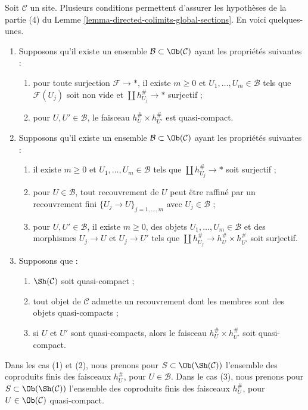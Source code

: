 \begin{remark}
\label{remark-stronger-conditions}
Soit $\mathcal{C}$ un site. Plusieurs conditions permettent d’assurer
les hypothèses de la partie (4) du
Lemme \ref{lemma-directed-colimits-global-sections}.
En voici quelques-unes.
\begin{enumerate}
\item Supposons qu’il existe un ensemble $\mathcal{B} \subset \Ob(\mathcal{C})$
ayant les propriétés suivantes :
\begin{enumerate}
\item pour toute surjection $\mathcal{F} \to *$, il existe
$m \geq 0$ et $U_1, \ldots, U_m \in \mathcal{B}$ tels que
$\mathcal{F}(U_j)$ soit non vide et $\coprod h_{U_j}^\# \to *$ surjectif ;
\item pour $U, U' \in \mathcal{B}$, le faisceau
$h_U^\# \times h_{U'}^\#$ est quasi-compact.
\end{enumerate}
\item Supposons qu’il existe un ensemble $\mathcal{B} \subset \Ob(\mathcal{C})$
ayant les propriétés suivantes :
\begin{enumerate}
\item il existe $m \geq 0$ et $U_1, \ldots, U_m \in \mathcal{B}$ tels que
$\coprod h_{U_j}^\# \to *$ soit surjectif ;
\item pour $U \in \mathcal{B}$, tout recouvrement de $U$ peut être
raffiné par un recouvrement fini $\{U_j \to U\}_{j = 1, \ldots, m}$
avec $U_j \in \mathcal{B}$ ;
\item pour $U, U' \in \mathcal{B}$, il existe
$m \geq 0$, des objets $U_1, \ldots, U_m \in \mathcal{B}$ et
des morphismes $U_j \to U$ et $U_j \to U'$ tels que
$\coprod h_{U_j}^\# \to h_U^\# \times h_{U'}^\#$ soit surjectif.
\end{enumerate}
\item Supposons que :
\begin{enumerate}
\item $\Sh(\mathcal{C})$ soit quasi-compact ;
\item tout objet de $\mathcal{C}$ admette un recouvrement
dont les membres sont des objets quasi-compacts ;
\item si $U$ et $U'$ sont quasi-compacts, alors le faisceau
$h_U^\# \times h_{U'}^\#$ soit quasi-compact.
\end{enumerate}
\end{enumerate}
Dans les cas (1) et (2), nous prenons pour $S \subset \Ob(\Sh(\mathcal{C}))$
l’ensemble des coproduits finis des faisceaux $h_U^\#$, pour
$U \in \mathcal{B}$.
Dans le cas (3), nous prenons pour $S \subset \Ob(\Sh(\mathcal{C}))$
l’ensemble des coproduits finis des faisceaux $h_U^\#$, pour
$U \in \Ob(\mathcal{C})$ quasi-compact.
\end{remark}

